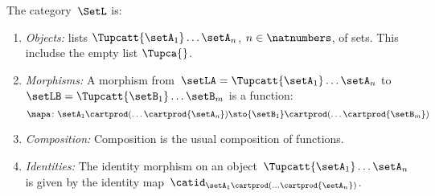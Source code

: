 %

\begin{definition}
    \label{def:SetL}
    The category~$\SetL$ is:
    \begin{enumerate}
        \item \emph{Objects:} lists $\Tupcatt {\setA_1}  \dots {\setA_n}$, $n \in \natnumbers$, of sets.
              This includse the empty list $\Tupca {}$.
        \item \emph{Morphisms:}
              A morphism from~$\setLA =\Tupcatt {\setA_1}  \dots {\setA_n}$ to~$\setLB = \Tupcatt {\setB_1} \dots {\setB_m}$ is a function:
              \begin{equation*}
                  \mapa\colon {\setA_1} \cartprod (\ldots \cartprod {\setA_n}) \sto {\setB_1} \cartprod (\ldots \cartprod {\setB_m})
              \end{equation*}
        \item \emph{Composition:}
              Composition is the usual composition of functions.
        \item \emph{Identities:}
              The identity morphism on an object~$\Tupcatt {\setA_1} \dots {\setA_n}$ is given by the identity map~$\catid_{{\setA_1} \cartprod (\ldots \cartprod {\setA_n})}$.
    \end{enumerate}
\end{definition}

